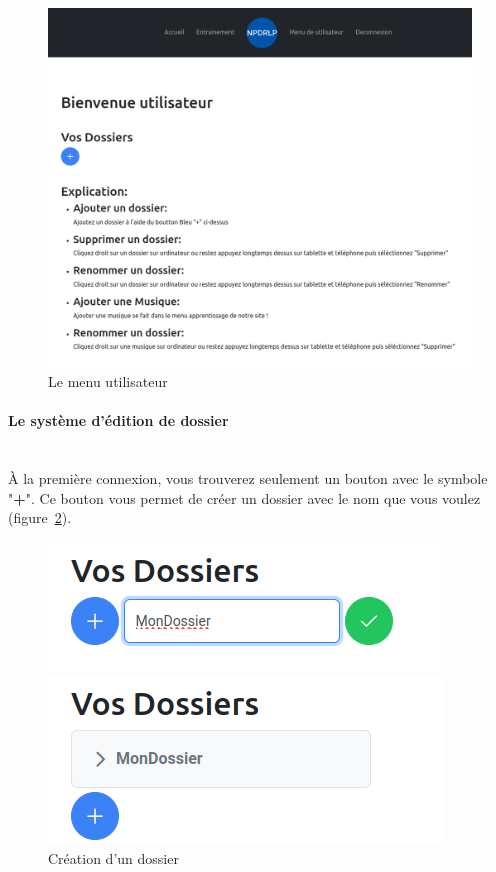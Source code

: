 \documentclass[12pt,french]{article}
\begin{document}
\begin{figure}[H]
	\centering
	\includegraphics[scale=0.21]{menu.png}
	\caption{Le menu utilisateur}
	\label{figure17} 
\end{figure}

\vspace*{5pt}

\paragraph{Le système d'édition de dossier \\\\}

À la première connexion, vous trouverez seulement un bouton avec le symbole "\textbf{+}". Ce bouton vous permet de créer un dossier avec le nom que vous voulez (figure~\ref{figure18}).

\begin{figure}[H]
	\centering
	\begin{minipage}{.5\textwidth}
		\centering
		\includegraphics[scale=0.4]{dossier1.png}
	\end{minipage}%
	\begin{minipage}{.5\textwidth}
		\centering
		\includegraphics[scale=0.4]{dossier2.png}
	\end{minipage}
	\caption{Création d'un dossier}
	\label{figure18} 
\end{figure}
\end{document}
